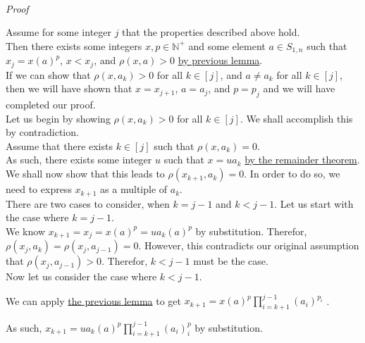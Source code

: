 \documentclass[a4paper,12pt]{article}
\begin{document}
\noindent\\
\textit{Proof}

\noindent Assume for some integer $j$ that the properties described above hold.\\

\noindent Then there exists some integers $x, p \in \mathbb{N}^+$ and some element $a \in S_{1, n}$ such that $x_j = x(a)^p$, $x < x_j$, and $\rho(x, a) > 0$ \hyperlink{lemma:non_common_factorization}{by previous lemma}.\\

\noindent If we can show that $\rho(x, a_k) > 0$ for all $k \in [j]$, and $a \neq a_k$ for all $k \in [j]$, then we will have shown that $x = x_{j + 1}$, $a = a_j$, and $p = p_j$ and we will have completed our proof.\\



\noindent Let us begin by showing $\rho(x, a_k) > 0$ for all $k \in [j]$. We shall accomplish this by contradiction.\\

\noindent Assume that there exists $k \in [j]$ such that $\rho(x, a_k) = 0$.\\

\noindent As such, there exists some integer $u$ such that $x = ua_k$ \hyperlink{theorem:remainder_theorem}{by the remainder theorem}.\\

\noindent We shall now show that this leads to $\rho(x_{k + 1}, a_k) = 0$. In order to do so, we need to express $x_{k + 1}$ as a multiple of $a_k$.\\

\noindent There are two cases to consider, when $k = j - 1$ and $k < j - 1$. Let us start with the case where $k = j - 1$.\\

\noindent We know $x_{k + 1} = x_j = x(a)^p = ua_k(a)^p$ by substitution. Therefor, $\rho(x_j, a_k) = \rho(x_j, a_{j - 1}) = 0$. However, this contradicts our original assumption that $\rho(x_j, a_{j - 1}) > 0$. Therefor, $k < j - 1$ must be the case.\\

\noindent Now let us consider the case where $k < j - 1$.

\noindent We can apply \hyperlink{lemma:closed_form_of_factorization}{the previous lemma} to get $\displaystyle x_{k + 1} = x(a)^p \prod_{i = k + 1}^{j - 1} (a_i)^{p_i}$ .

\noindent As such, $\displaystyle x_{k+1} = ua_k(a)^p \prod_{i = k + 1}^{j - 1} (a_i)^p_i$ by substitution.\\
\end{document}
